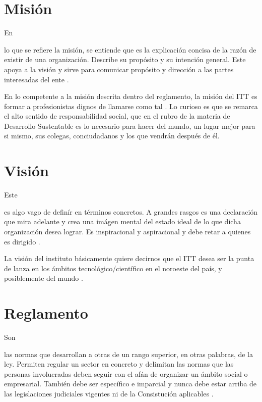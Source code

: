 \documentclass[stu, 12pt, letterpaper, donotrepeattitle, floatsintext, natbib]{apa7}
\begin{document}
\section{Misión}
En \begin{justifying}
    lo que se refiere la misión, se entiende que es la explicación concisa de la razón de existir de una organización. Describe su propósito y su intención general.
Este apoya a la visión y sirve para comunicar propósito y dirección a las partes interesadas del ente \citep{unknown-author-no-date}.\par
\vspace{\baselineskip}
En lo competente a la misión descrita dentro del reglamento, la misión del ITT es formar a profesionistas dignos de llamarse como tal \citep{subdireccion-academica-itt-2020}. Lo curioso es que se remarca el alto sentido de responsabilidad social,
que en el rubro de la materia de Desarrollo Sustentable es lo necesario para hacer del mundo, un lugar mejor para si mismo, sus colegas, conciudadanos y los que vendrán después de él.\par
\vspace{\baselineskip}
\end{justifying}

\section{Visión}
Este \begin{justifying}
    es algo vago de definír en términos concretos. A grandes rasgos es una declaración que mira adelante y crea una imágen mental del estado ideal de lo que dicha organización
desea lograr. Es inspiracional y aspiracional y debe retar a quienes es dirigido \citep{corporate-finance-institute-2020}.\par
\vspace{\baselineskip}
La visión del instituto básicamente quiere decirnos que el ITT desea ser la punta de lanza en los ámbitos tecnológico/científico en el noroeste del país, y posiblemente del mundo \citep{subdireccion-academica-itt-2020}.\par
\vspace{\baselineskip}
\end{justifying}

\section{Reglamento}
Son \begin{justifying}
las normas que desarrollan a otras de un rango superior, en otras palabras, de la ley. Permiten regular un sector en concreto y delimitan las normas que las personas involucradas deben seguir
con el afán de organizar un ámbito social o empresarial. También debe ser específico e imparcial y nunca debe estar arriba de las legislaciones judiciales vigentes ni de la Consistución aplicables \citep{trujillo-2021}.\par
\vspace{\baselineskip}\end{justifying} 
\end{document}
